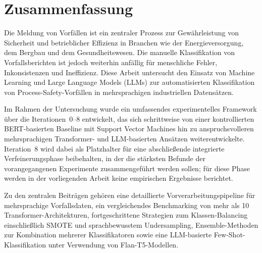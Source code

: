 \documentclass[11pt, titlepage, bibliography=totoc]{scrreprt}
\begin{document}
\cleardoublepage

\chapter*{Zusammenfassung}

Die Meldung von Vorfällen ist ein zentraler Prozess zur Gewährleistung von Sicherheit und betrieblicher Effizienz in Branchen wie der Energieversorgung, dem Bergbau und dem Gesundheitswesen. Die manuelle Klassifikation von Vorfallsberichten ist jedoch weiterhin anfällig für menschliche Fehler, Inkonsistenzen und Ineffizienz. Diese Arbeit untersucht den Einsatz von Machine Learning und Large Language Models (LLMs) zur automatisierten Klassifikation von Process-Safety-Vorfällen in mehrsprachigen industriellen Datensätzen.

Im Rahmen der Untersuchung wurde ein umfassendes experimentelles Framework über die Iterationen~0--8 entwickelt, das sich schrittweise von einer kontrollierten BERT-basierten Baseline mit Support Vector Machines hin zu anspruchsvolleren mehrsprachigen Transformer- und LLM-basierten Ansätzen weiterentwickelte. Iteration~8 wird dabei als Platzhalter für eine abschließende integrierte Verfeinerungsphase beibehalten, in der die stärksten Befunde der vorangegangenen Experimente zusammengeführt werden sollen; für diese Phase werden in der vorliegenden Arbeit keine empirischen Ergebnisse berichtet.

Zu den zentralen Beiträgen gehören eine detaillierte Vorverarbeitungspipeline für mehrsprachige Vorfallsdaten, ein vergleichendes Benchmarking von mehr als 10 Transformer-Architekturen, fortgeschrittene Strategien zum Klassen-Balancing einschließlich SMOTE und sprachbewusstem Undersampling, Ensemble-Methoden zur Kombination mehrerer Klassifikatoren sowie eine LLM-basierte Few-Shot-Klassifikation unter Verwendung von Flan-T5-Modellen.
\end{document}
